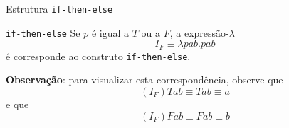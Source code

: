\begin{frame}[fragile]{Estrutura \texttt{if-then-else}}

    \begin{block}{\texttt{if-then-else}}
        Se $p$ é igual a $T$ ou a $F$, a expressão-$\lambda$
        \[
            I_F \equiv \lambda pab.pab
        \]
        é corresponde ao construto \texttt{if-then-else}. 
    \end{block}

    \vspace{0.1in}

    \textbf{Observação}: para visualizar esta correspondência, observe que
    \[
        (I_F) Tab \equiv Tab \equiv a
    \]
    e que
    \[
        (I_F) Fab \equiv Fab \equiv b
    \]
\end{frame}
